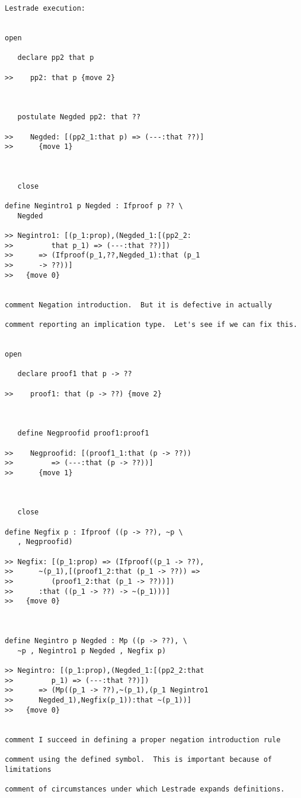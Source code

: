 \documentclass[12pt]{article}
\begin{document}
\begin{verbatim}Lestrade execution:


open

   declare pp2 that p

>>    pp2: that p {move 2}



   postulate Negded pp2: that ??

>>    Negded: [(pp2_1:that p) => (---:that ??)]
>>      {move 1}



   close

define Negintro1 p Negded : Ifproof p ?? \
   Negded

>> Negintro1: [(p_1:prop),(Negded_1:[(pp2_2:
>>         that p_1) => (---:that ??)])
>>      => (Ifproof(p_1,??,Negded_1):that (p_1
>>      -> ??))]
>>   {move 0}


comment Negation introduction.  But it is defective in actually 

comment reporting an implication type.  Let's see if we can fix this.


open

   declare proof1 that p -> ??

>>    proof1: that (p -> ??) {move 2}



   define Negproofid proof1:proof1

>>    Negproofid: [(proof1_1:that (p -> ??))
>>         => (---:that (p -> ??))]
>>      {move 1}



   close

define Negfix p : Ifproof ((p -> ??), ~p \
   , Negproofid)

>> Negfix: [(p_1:prop) => (Ifproof((p_1 -> ??),
>>      ~(p_1),[(proof1_2:that (p_1 -> ??)) =>
>>         (proof1_2:that (p_1 -> ??))])
>>      :that ((p_1 -> ??) -> ~(p_1)))]
>>   {move 0}



define Negintro p Negded : Mp ((p -> ??), \
   ~p , Negintro1 p Negded , Negfix p)

>> Negintro: [(p_1:prop),(Negded_1:[(pp2_2:that
>>         p_1) => (---:that ??)])
>>      => (Mp((p_1 -> ??),~(p_1),(p_1 Negintro1
>>      Negded_1),Negfix(p_1)):that ~(p_1))]
>>   {move 0}


comment I succeed in defining a proper negation introduction rule

comment using the defined symbol.  This is important because of limitations

comment of circumstances under which Lestrade expands definitions.

\end{verbatim}
\end{document}
